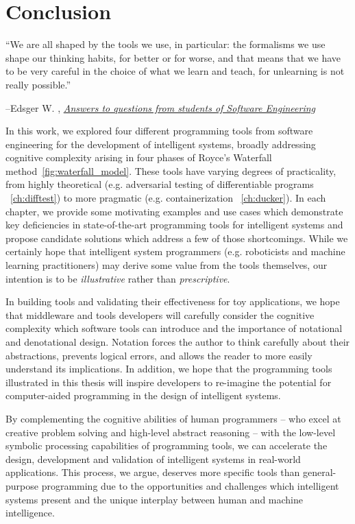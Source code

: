 \chapter{Conclusion}\label{ch:conclusion}
\setlength{\epigraphwidth}{0.90\textwidth}
\epigraph{``We are all shaped by the tools we use, in particular: the formalisms we use shape our thinking habits, for better or for worse, and that means that we have to be very careful in the choice of what we learn and teach, for unlearning is not really possible.''}{\begin{flushright}--Edsger W. \citet{dijkstra2000answers}, \href{https://www.cs.utexas.edu/~EWD/transcriptions/EWD13xx/EWD1305.html}{\textit{Answers to questions from students of Software Engineering}}\end{flushright}}

In this work, we explored four different programming tools from software engineering for the development of intelligent systems, broadly addressing cognitive complexity arising in four phases of Royce's Waterfall method~\autoref{fig:waterfall_model}. These tools have varying degrees of practicality, from highly theoretical (e.g. adversarial testing of differentiable programs ~\autoref{ch:difftest}) to more pragmatic (e.g. containerization ~\autoref{ch:ducker}). In each chapter, we provide some motivating examples and use cases which demonstrate key deficiencies in state-of-the-art programming tools for intelligent systems and propose candidate solutions which address a few of those shortcomings. While we certainly hope that intelligent system programmers (e.g. roboticists and machine learning practitioners) may derive some value from the tools themselves, our intention is to be \textit{illustrative} rather than \textit{prescriptive}.

In building tools and validating their effectiveness for toy applications, we hope that middleware and tools developers will carefully consider the cognitive complexity which software tools can introduce and the importance of notational and denotational design. Notation forces the author to think carefully about their abstractions, prevents logical errors, and allows the reader to more easily understand its implications. In addition, we hope that the programming tools illustrated in this thesis will inspire developers to re-imagine the potential for computer-aided programming in the design of intelligent systems.

By complementing the cognitive abilities of human programmers -- who excel at creative problem solving and high-level abstract reasoning -- with the low-level symbolic processing capabilities of programming tools, we can accelerate the design, development and validation of intelligent systems in real-world applications. This process, we argue, deserves more specific tools than general-purpose programming due to the opportunities and challenges which intelligent systems present and the unique interplay between human and machine intelligence.

